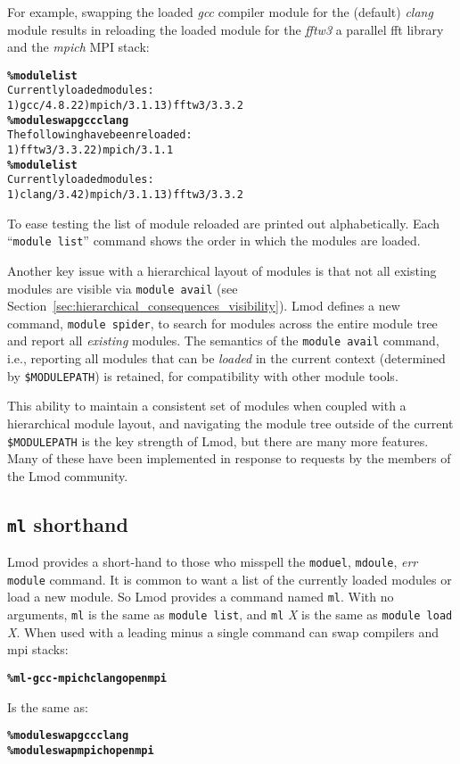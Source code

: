 For example, swapping the loaded \emph{gcc} compiler module for the (default)
\emph{clang} module results in reloading the loaded module for the
\emph{fftw3} a parallel fft library and the \emph{mpich} MPI stack:
{\small
  \begin{alltt}
    \textbf{\% module list}
    Currently loaded modules:
    1) gcc/4.8.2  2) mpich/3.1.1  3) fftw3/3.3.2
    \textbf{\% module swap gcc clang}
    The following have been reloaded:
    1) fftw3/3.3.2  2) mpich/3.1.1
    \textbf{\% module list}
    Currently loaded modules:
    1) clang/3.4  2) mpich/3.1.1  3) fftw3/3.3.2
\end{alltt}
}
\noindent
To ease testing the list of module reloaded are printed out
alphabetically. Each ``\texttt{module list}'' command shows the
order in which the modules are loaded.


Another key issue with a hierarchical layout of modules is that not all
existing modules are visible via \texttt{module avail} (see
Section~\ref{sec:hierarchical_consequences_visibility}). Lmod defines a
new command, \texttt{module spider}, to search for modules across the
entire module tree and report all \emph{existing} modules. The semantics of
the \texttt{module avail} command, i.e., reporting all modules that can
be \emph{loaded} in the current context (determined by
\texttt{\$MODULEPATH}) is retained, for compatibility with other module
tools.

This ability to maintain a consistent set of modules when coupled with a
hierarchical module layout, and navigating the module tree outside of the
current \texttt{\$MODULEPATH} is the key strength of Lmod, but there are
many more features.  Many of these have been implemented in response to
requests by the members of the Lmod community.

\subsection{\texttt{ml} shorthand}

Lmod provides a short-hand to those who misspell the \texttt{moduel}, \texttt{mdoule}, \emph{err}
\texttt{module} command.  It is common to want a list of the currently loaded
modules or load a new module.  So Lmod provides a command named
\texttt{ml}.  With no arguments, \texttt{ml} is the same as
\texttt{module list}, and \texttt{ml} \emph{X} is the same as \texttt{module
  load} \emph{X}.  When used with a leading minus a single command can
swap compilers and mpi stacks:
{\small
  \begin{alltt}      \textbf{\% ml -gcc -mpich clang openmpi}\end{alltt}
}
\noindent
Is the same as:
{\small\begin{alltt}      \textbf{\% module swap gcc clang}
      \textbf{\% module swap mpich openmpi}\end{alltt}}

